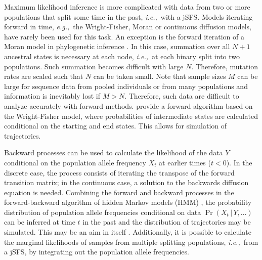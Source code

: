 \documentclass[preprint]{elsarticle}
\newcommand\given{{\,|\,}}
\newcommand\eg{{\it e.g.,}}
\newcommand\ie{{\it i.e.,}}
\begin{document}
Maximum likelihood inference is more complicated with data from two or more populations that split some time in the past, \ie\ with a jSFS. Models iterating forward in time, \eg\ the Wright-Fisher, Moran or continuous diffusion models, have rarely been used for this task. An exception is the forward iteration of a Moran model in phylogenetic inference \citep{Schrempf2016}. In this case, summation over all $N+1$ ancestral states is necessary at each node, \ie\ at each binary split into two populations. Such summation becomes difficult with large $N$. Therefore, mutation rates are scaled such that $N$ can be taken small. Note that sample sizes $M$ can be large for sequence data from pooled individuals or from many populations and information is inevitably lost if $M>N$. Therefore, such data are  difficult to analyze accurately with forward methods. %
\citet{Zhao14} provide a forward algorithm based on the Wright-Fisher model, where probabilities of intermediate states are calculated conditional on the starting and end states. This allows for simulation of trajectories. 

Backward processes can be used to calculate the likelihood of the data $Y$ conditional on the population allele frequency $X_t$  at earlier times ($t<0$). %
In the discrete case, the process consists of iterating the transpose of the forward transition matrix; in the continuous case, a solution to the backwards diffusion equation is needed.
Combining the forward and backward processes in the forward-backward algorithm of hidden Markov models (HMM) \citep{Rabi86}, the probability distribution of population allele frequencies conditional on data $\Pr(X_t\given Y,\dots)$ can be inferred at time $t$ in the past and the distribution of trajectories may be simulated. This may be an aim in itself \citep{Zhao14}. Additionally, it is  possible to calculate the marginal likelihoods of samples from multiple splitting populations, \ie\ from a jSFS, by integrating out the population allele frequencies.
\end{document}
